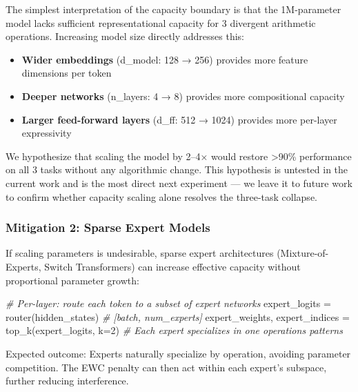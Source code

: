 \documentclass[
]{article}
\newenvironment{Shaded}{}{}
\newcommand{\CommentTok}[1]{\textcolor[rgb]{0.38,0.63,0.69}{\textit{#1}}}
\newcommand{\DecValTok}[1]{\textcolor[rgb]{0.25,0.63,0.44}{#1}}
\newcommand{\NormalTok}[1]{#1}
\newcommand{\OperatorTok}[1]{\textcolor[rgb]{0.40,0.40,0.40}{#1}}
\providecommand{\tightlist}{%
  \setlength{\itemsep}{0pt}\setlength{\parskip}{0pt}}
\begin{document}
The simplest interpretation of the capacity boundary is that the
1M-parameter model lacks sufficient representational capacity for 3
divergent arithmetic operations. Increasing model size directly
addresses this:

\begin{itemize}
\tightlist
\item
  \textbf{Wider embeddings} (d\_model: 128 → 256) provides more feature
  dimensions per token
\item
  \textbf{Deeper networks} (n\_layers: 4 → 8) provides more
  compositional capacity
\item
  \textbf{Larger feed-forward layers} (d\_ff: 512 → 1024) provides more
  per-layer expressivity
\end{itemize}

We hypothesize that scaling the model by 2--4× would restore
\textgreater90\% performance on all 3 tasks without any algorithmic
change. This hypothesis is untested in the current work and is the most
direct next experiment --- we leave it to future work to confirm whether
capacity scaling alone resolves the three-task collapse.

\subsubsection{Mitigation 2: Sparse Expert
Models}\label{mitigation-2-sparse-expert-models}

If scaling parameters is undesirable, sparse expert architectures
(Mixture-of-Experts, Switch Transformers) can increase effective
capacity without proportional parameter growth:

\begin{Shaded}
\begin{Highlighting}[]
\CommentTok{\# Per{-}layer: route each token to a subset of expert networks}
\NormalTok{expert\_logits }\OperatorTok{=}\NormalTok{ router(hidden\_states)  }\CommentTok{\# [batch, num\_experts]}
\NormalTok{expert\_weights, expert\_indices }\OperatorTok{=}\NormalTok{ top\_k(expert\_logits, k}\OperatorTok{=}\DecValTok{2}\NormalTok{)}
\CommentTok{\# Each expert specializes in one operation\textquotesingle{}s patterns}
\end{Highlighting}
\end{Shaded}

Expected outcome: Experts naturally specialize by operation, avoiding
parameter competition. The EWC penalty can then act within each expert's
subspace, further reducing interference.
\end{document}
